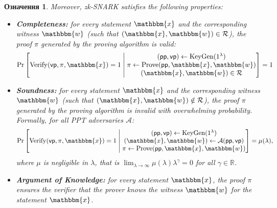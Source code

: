\documentclass[12pt,a4paper,oneside]{book}
\theoremstyle{dplplain}
\theoremstyle{dpldefinition}
\newtheorem{definition}[theorem]{Означення}%
\theoremstyle{dplremark}
\begin{document}
\begin{definition}
    Moreover, zk-SNARK satisfies the following properties:
    \begin{itemize}
        \item \textbf{Completeness:} for every statement $\mathbbm{x}$ and the
        corresponding witness $\mathbbm{w}$ (such that $(\mathbbm{x},
        \mathbbm{w}) \in \mathcal{R}$), the proof $\pi$ generated by the proving
        algorithm is valid:
        \begin{equation*}
            \text{Pr}\left[ \mathrm{Verify}(\mathsf{vp}, \pi, \mathbbm{x})=1 \;\middle|\; 
            \begin{matrix}
                (\mathsf{pp}, \mathsf{vp}) \gets \mathrm{KeyGen}(1^{\lambda}) \\
                \pi \gets \mathrm{Prove}(\mathsf{pp}, \mathbbm{x}, \mathbbm{w}) \\
                (\mathbbm{x}, \mathbbm{w}) \in \mathcal{R}
            \end{matrix}
            \right] = 1
        \end{equation*}
        \item \textbf{Soundness:} for every statement $\mathbbm{x}$ and the
        corresponding witness $\mathbbm{w}$ (such that $(\mathbbm{x},
        \mathbbm{w}) \notin \mathcal{R}$), the proof $\pi$ generated by the
        proving algorithm is invalid with overwhelming probability. Formally, 
        for all PPT adversaries $\mathcal{A}$:
        \begin{equation*}
            \text{Pr}\left[ \mathrm{Verify}(\mathsf{vp}, \pi, \mathbbm{x})=1 \;\middle|\; 
            \begin{matrix}
                (\mathsf{pp}, \mathsf{vp}) \gets \mathrm{KeyGen}(1^{\lambda}) \\
                (\mathbbm{x}, \mathbbm{w}) \gets \mathcal{A}(\mathsf{pp}, \mathsf{vp}) \\
                \pi \gets \mathrm{Prove}(\mathsf{pp}, \mathbbm{x}, \mathbbm{w})
            \end{matrix}
            \right] = \mu(\lambda),
        \end{equation*}
        where $\mu$ is negligible in $\lambda$, that is $\lim_{\lambda \to
        \infty}\mu(\lambda)\lambda^{\gamma}=0$ for all $\gamma \in \mathbb{R}$.
        \item \textbf{Argument of Knowledge:} for every statement $\mathbbm{x}$,
        the proof $\pi$ ensures the verifier that the prover \textit{knows} the
        witness $\mathbbm{w}$ for the statement $\mathbbm{x}$.

\end{itemize}
\end{definition}
\end{document}
